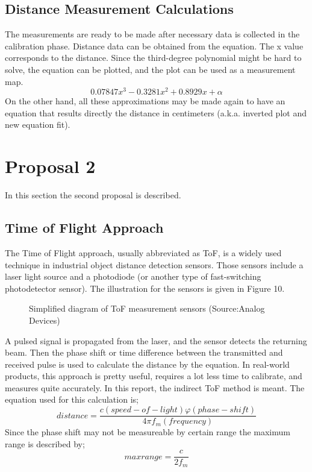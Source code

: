 \documentclass[letterpaper,12pt]{article}
\begin{document}
\subsection{Distance Measurement Calculations}
The measurements are ready to be made after necessary data is collected in the calibration phase. Distance data can be obtained from the equation. The x value corresponds to the distance. Since the third-degree polynomial might be hard to solve, the equation can be plotted, and the plot can be used as a measurement map.%
\[0.07847 x^3 -0.3281 x^2 + 0.8929x + \alpha\]
On the other hand, all these approximations may be made again to have an equation that results directly the distance in centimeters (a.k.a. inverted plot and new equation fit).  



\section{Proposal 2}
In this section the second proposal is described.
\subsection{Time of Flight Approach}
The Time of Flight approach, usually abbreviated as ToF, is a widely used technique in industrial object distance detection sensors. Those sensors include a laser light source and a photodiode (or another type of fast-switching photodetector sensor). The illustration for the sensors is given in Figure 10.
\begin{figure}[H] 
	\caption{Simplified diagram of ToF measurement sensors (Source:Analog Devices)}
\end{figure}
A pulsed signal is propagated from the laser, and the sensor detects the returning beam. Then the phase shift or time difference between the transmitted and received pulse is used to calculate the distance by the equation.
In real-world products, this approach is pretty useful, requires a lot less time to calibrate, and measures quite accurately. In this report, the indirect ToF method is meant. The equation used for this calculation is; 
\[distance = \frac{  c(speed-of-light)  \varphi (phase-shift)  }{4 \pi f_m (frequency)}\]
Since the phase shift may not be measureable by certain range the maximum range is described by;
\[maxrange = \frac{c}{2 f_m}\]
\end{document}
